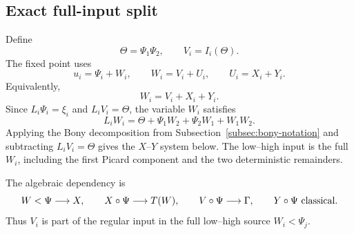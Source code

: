 \documentclass[10pt]{amsart}
\numberwithin{equation}{section}
\theoremstyle{plain}
\theoremstyle{definition}
\theoremstyle{remark}
\begin{document}
\subsection{Exact full-input split}
Define
\begin{equation}\label{eq:Theta-def}
\Theta=\Psi_1\Psi_2,
\qquad
V_i=I_i(\Theta).
\end{equation}
The fixed point uses
\begin{equation}\label{eq:three-layer}
u_i=\Psi_i+W_i,
\qquad
W_i=V_i+U_i,
\qquad
U_i=X_i+Y_i.
\end{equation}
Equivalently,
\begin{equation}\label{eq:W-full-def}
W_i=V_i+X_i+Y_i.
\end{equation}
Since $L_i\Psi_i=\xi_i$ and $L_iV_i=\Theta$, the variable $W_i$ satisfies
\begin{equation}\label{eq:Wi-eq}
L_iW_i=\Theta+\Psi_1W_2+\Psi_2W_1+W_1W_2.
\end{equation}
Applying the Bony decomposition from Subsection~\ref{subsec:bony-notation} and subtracting $L_iV_i=\Theta$ gives the $X$--$Y$ system below. The low--high input is the full $W_i$, including the first Picard component and the two deterministic remainders.

The algebraic dependency is
\[
 W<\Psi \longrightarrow X,\qquad
 X\circ\Psi \longrightarrow T(W),\qquad
 V\circ\Psi \longrightarrow \Gamma,\qquad
 Y\circ\Psi \ \hbox{classical}.
\]
Thus \(V_i\) is part of the regular input in the full low--high source \(W_i<\Psi_j\).
\end{document}
